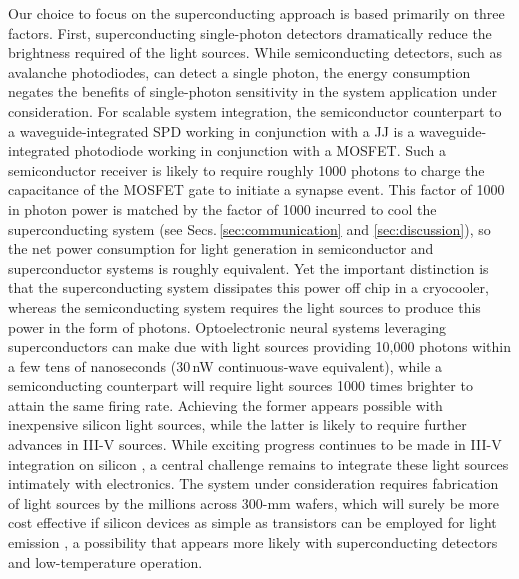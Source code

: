 \documentclass[twocolumn]{article}
\begin{document}
Our choice to focus on the superconducting approach is based primarily on three factors. First, superconducting single-photon detectors dramatically reduce the brightness required of the light sources. While semiconducting detectors, such as avalanche photodiodes, can detect a single photon, the energy consumption negates the benefits of single-photon sensitivity in the system application under consideration. For scalable system integration, the semiconductor counterpart to a waveguide-integrated SPD working in conjunction with a JJ is a waveguide-integrated photodiode working in conjunction with a MOSFET. Such a semiconductor receiver is likely to require roughly 1000 photons to charge the capacitance of the MOSFET gate \cite{mi2017} to initiate a synapse event. This factor of 1000 in photon power is matched by the factor of 1000 incurred to cool the superconducting system (see Secs.\,\ref{sec:communication} and \ref{sec:discussion}), so the net power consumption for light generation in semiconductor and superconductor systems is roughly equivalent. Yet the important distinction is that the superconducting system dissipates this power off chip in a cryocooler, whereas the semiconducting system requires the light sources to produce this power in the form of photons. Optoelectronic neural systems leveraging superconductors can make due with light sources providing 10,000 photons within a few tens of nanoseconds (30\,nW continuous-wave equivalent), while a semiconducting counterpart will require light sources 1000 times brighter to attain the same firing rate. Achieving the former appears possible with inexpensive silicon light sources, while the latter is likely to require further advances in III-V sources. While exciting progress continues to be made in III-V integration on silicon \cite{tapa2019,hala2020}, a central challenge remains to integrate these light sources intimately with electronics. The system under consideration requires fabrication of light sources by the millions across 300-mm wafers, which will surely be more cost effective if silicon devices as simple as transistors can be employed for light emission \cite{buch2017}, a possibility that appears more likely with superconducting detectors and low-temperature operation.
\end{document}
